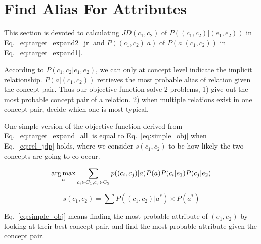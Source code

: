 \section{Find Alias For Attributes}
\label{sec:fafa}





This section is devoted to calculating $JD(c_1,c_2)$ of $P((c_{1},c_{2})|(e_{1},e_{2}))$ in Eq.~\ref{eq:target_expand2_jr} and $P((c_{1},c_{2})|a)$ of $P(a|(c_{1},c_{2}))$ in Eq.~\ref{eq:target_expand1}.

According to $P(c_1,c_2|e_1,e_2)$, we can only at concept level indicate the implicit relationship. $P(a|(c_{1},c_{2}))$ retrieves the most probable alias of relation given the concept pair. Thus our objective function solve 2 problems, 1) give out the most probable concept pair of a relation. 2) when multiple relations exist in one concept pair, decide which one is most typical.




One simple version of the objective function derived from Eq.~\ref{eq:target_expand_all} is equal to Eq.~\ref{eq:simple_obj} when Eq.~\ref{eq:rel_jdp} holds, where we consider $s(c_1,c_2)$ to be how likely the two concepts are going to co-occur.

\begin{equation}
\label{eq:simple_obj}
 \operatorname*{arg\,max}_a \sum_{c_i\in C_1, c_j\in C_2} p((c_{i},c_{j})|a) P(a) P(c_i|e_1) P(c_j|e_2)
\end{equation}

\begin{equation}\label{eq:rel_jdp}
  s(c_1,c_2) = \sum{ P((c_{1},c_{2})|a^*) \times P(a^*)}
\end{equation}

Eq.~\ref{eq:simple_obj} means finding the most probable attribute of $(e_1,e_2)$ by looking at their best concept pair, and find the most probable attribute given the concept pair.



